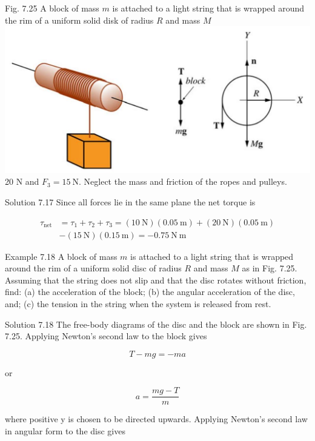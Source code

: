 \documentclass[10pt]{article}
\begin{document}
Fig. 7.25 A block of mass $m$ is attached to a light string that is wrapped around the rim of a uniform solid disk of radius $R$ and mass $M$\\
\includegraphics[max width=\textwidth, center]{2024_09_13_db1f357d2aad0a03eb2eg-125}\\
20 N and $F_{3}=15 \mathrm{~N}$. Neglect the mass and friction of the ropes and pulleys.

Solution 7.17 Since all forces lie in the same plane the net torque is

$$
\begin{aligned}
\tau_{\mathrm{net}} & =\tau_{1}+\tau_{2}+\tau_{3}=(10 \mathrm{~N})(0.05 \mathrm{~m})+(20 \mathrm{~N})(0.05 \mathrm{~m}) \\
& -(15 \mathrm{~N})(0.15 \mathrm{~m})=-0.75 \mathrm{~N} \mathrm{~m}
\end{aligned}
$$

Example 7.18 A block of mass $m$ is attached to a light string that is wrapped around the rim of a uniform solid disc of radius $R$ and mass $M$ as in Fig. 7.25. Assuming that the string does not slip and that the disc rotates without friction, find: (a) the acceleration of the block; (b) the angular acceleration of the disc, and; (c) the tension in the string when the system is released from rest.

Solution 7.18 The free-body diagrams of the disc and the block are shown in Fig. 7.25. Applying Newton's second law to the block gives

$$
T-m g=-m a
$$

or


\begin{equation*}
a=\frac{m g-T}{m} \tag{7.13}
\end{equation*}


where positive y is chosen to be directed upwards. Applying Newton's second law in angular form to the disc gives
\end{document}
